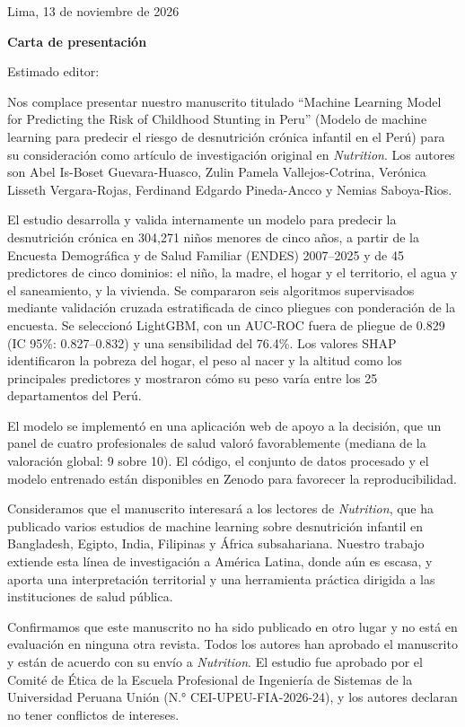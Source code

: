 \documentclass[11pt]{article}
\begin{document}
\hfill Lima, 13 de noviembre de 2026

\begin{center}\large\bfseries Carta de presentación\end{center}

Estimado editor:

Nos complace presentar nuestro manuscrito titulado “Machine Learning Model for Predicting the Risk of Childhood Stunting in Peru” (Modelo de machine learning para predecir el riesgo de desnutrición crónica infantil en el Perú) para su consideración como artículo de investigación original en \emph{Nutrition}. Los autores son Abel Is-Boset Guevara-Huasco, Zulin Pamela Vallejos-Cotrina, Verónica Lisseth Vergara-Rojas, Ferdinand Edgardo Pineda-Ancco y Nemias Saboya-Rios.

El estudio desarrolla y valida internamente un modelo para predecir la desnutrición crónica en 304,271 niños menores de cinco años, a partir de la Encuesta Demográfica y de Salud Familiar (ENDES) 2007–2025 y de 45 predictores de cinco dominios: el niño, la madre, el hogar y el territorio, el agua y el saneamiento, y la vivienda. Se compararon seis algoritmos supervisados mediante validación cruzada estratificada de cinco pliegues con ponderación de la encuesta. Se seleccionó LightGBM, con un AUC-ROC fuera de pliegue de 0.829 (IC 95\%: 0.827–0.832) y una sensibilidad del 76.4\%. Los valores SHAP identificaron la pobreza del hogar, el peso al nacer y la altitud como los principales predictores y mostraron cómo su peso varía entre los 25 departamentos del Perú.

El modelo se implementó en una aplicación web de apoyo a la decisión, que un panel de cuatro profesionales de salud valoró favorablemente (mediana de la valoración global: 9 sobre 10). El código, el conjunto de datos procesado y el modelo entrenado están disponibles en Zenodo para favorecer la reproducibilidad.

Consideramos que el manuscrito interesará a los lectores de \emph{Nutrition}, que ha publicado varios estudios de machine learning sobre desnutrición infantil en Bangladesh, Egipto, India, Filipinas y África subsahariana. Nuestro trabajo extiende esta línea de investigación a América Latina, donde aún es escasa, y aporta una interpretación territorial y una herramienta práctica dirigida a las instituciones de salud pública.

Confirmamos que este manuscrito no ha sido publicado en otro lugar y no está en evaluación en ninguna otra revista. Todos los autores han aprobado el manuscrito y están de acuerdo con su envío a \emph{Nutrition}. El estudio fue aprobado por el Comité de Ética de la Escuela Profesional de Ingeniería de Sistemas de la Universidad Peruana Unión (N.° CEI-UPEU-FIA-2026-24), y los autores declaran no tener conflictos de intereses.
\end{document}
